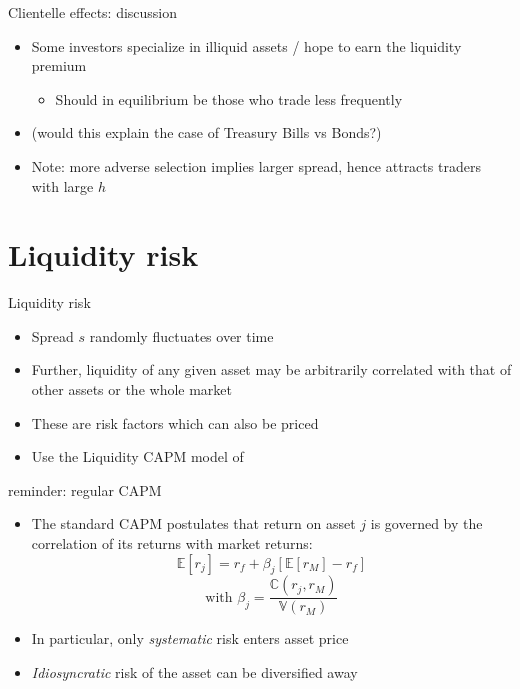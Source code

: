 \documentclass[english,10pt
,aspectratio=169
]{beamer}
\begin{document}
\begin{frame}{Clientelle effects: discussion}
	\begin{itemize}
		\item Some investors specialize in illiquid assets / hope to earn the liquidity premium
		\begin{itemize}
			\item Should in equilibrium be those who trade less frequently
		\end{itemize}
		\item (would this explain the case of Treasury Bills vs Bonds?) 
		\item Note: more adverse selection implies larger spread, hence attracts traders with large $h$
	\end{itemize}
\end{frame}


\section{Liquidity risk}

\begin{frame}{Liquidity risk}
	\begin{itemize}
		\item Spread $s$ randomly fluctuates over time
		\item Further, liquidity of any given asset may be arbitrarily correlated with that of other assets or the whole market
		\item These are risk factors which can also be priced
		\item Use the Liquidity CAPM model of \cite{acharya_asset_2005}
	\end{itemize}
\end{frame}


\begin{frame}{reminder: regular CAPM}
	\begin{itemize}
		\item The standard CAPM postulates that return on asset $j$ is governed by the correlation of its returns with market returns:
		\begin{equation*}
			\mathbb{E}[r_j] = r_f + \beta_j \left[ \mathbb{E}[r_M] - r_f \right]
		\end{equation*}
		\begin{equation*}
			\text{with } \beta_j = \frac{\mathbb{C}(r_j, r_M)}{\mathbb{V}(r_M)}
		\end{equation*}
		\item In particular, only \emph{systematic} risk enters asset price
		\item \emph{Idiosyncratic} risk of the asset can be diversified away
	\end{itemize}
\end{frame}
\end{document}
